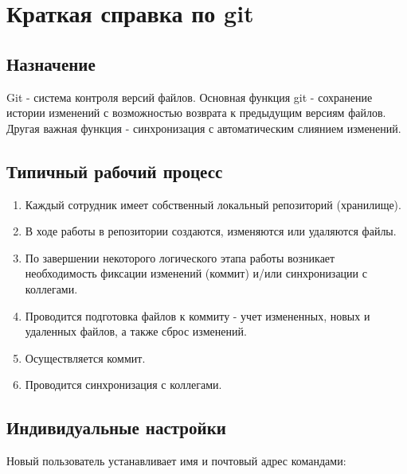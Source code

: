 \documentclass[a4paper,12pt,oneside]{sphinxmanual}
\begin{document}

\chapter{Краткая справка по git}
\label{git_short_manual:git-short-manual}\label{git_short_manual:index-0}\label{git_short_manual:git}\label{git_short_manual::doc}

\section{Назначение}
\label{git_short_manual:what-is-git}\label{git_short_manual:id1}
Git - система контроля версий файлов. Основная функция git - сохранение истории изменений с возможностью возврата к предыдущим версиям файлов. Другая важная функция - синхронизация с автоматическим слиянием изменений.


\section{Типичный рабочий процесс}
\label{git_short_manual:id2}\label{git_short_manual:git-pipeline}\begin{enumerate}
\item {} 
Каждый сотрудник имеет собственный локальный репозиторий (хранилище).

\item {} 
В ходе работы в репозитории создаются, изменяются или удаляются файлы.

\item {} 
По завершении некоторого логического этапа работы возникает необходимость фиксации изменений (коммит) и/или синхронизации с коллегами.

\item {} 
Проводится подготовка файлов к коммиту - учет измененных, новых и удаленных файлов, а также сброс изменений.

\item {} 
Осуществляется коммит.

\item {} 
Проводится синхронизация с коллегами.

\end{enumerate}


\section{Индивидуальные настройки}
\label{git_short_manual:id3}\label{git_short_manual:git-config}\label{git_short_manual:index-1}
Новый пользователь устанавливает имя и почтовый адрес командами:
\end{document}
